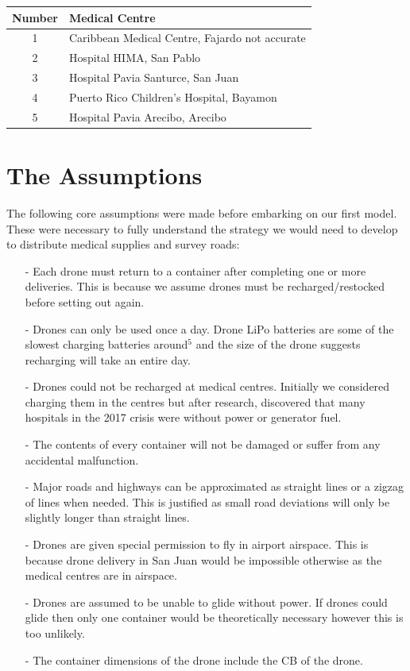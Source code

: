 \documentclass[a4paper,12pt]{article}
\begin{document}
\begin{center}
\begin{tabular}{ |c|l| }
 \hline
 Number & Medical Centre  \\\hline
 1 & Caribbean Medical Centre, Fajardo not accurate  \\
 2 & Hospital HIMA, San Pablo \\
 3 & Hospital Pavia Santurce, San Juan \\
 4 & Puerto Rico Children's Hospital, Bayamon \\
 5 & Hospital Pavia Arecibo, Arecibo  \\
 \hline
\end{tabular}
\end{center}

\section{The Assumptions}
The following core assumptions were made before embarking on our first model. These were necessary to fully understand the strategy we would
need to develop to distribute medical supplies and survey roads:

\begin{itemize}
\item[-]Each drone must return to a container after completing one or more deliveries.
        This is because we assume drones must be recharged/restocked before setting out again.
\item[-]Drones can only be used once a day. Drone LiPo batteries are some of the slowest charging batteries around$^{5}$ and
        the size of the drone suggests recharging will take an entire day.
\item[-]Drones could not be recharged at medical centres.
        Initially we considered charging them in the centres but after research, discovered that
        many hospitals in the 2017 crisis were without power or generator fuel.
\item[-]The contents of every container will not be damaged or suffer from any accidental malfunction.
\item[-]Major roads and highways can be approximated as straight lines or a zigzag of lines when needed. This is justified as small road deviations will only be slightly longer than straight lines.
\item[-]Drones are given special permission to fly in airport airspace. This is because drone delivery in San Juan would be impossible otherwise as the medical centres are in airspace.
\item[-]Drones are assumed to be unable to glide without power. If drones could glide then only one container would be theoretically necessary however this is too unlikely.
\item[-]The container dimensions of the drone include the CB of the drone.
\end{itemize}
\end{document}
